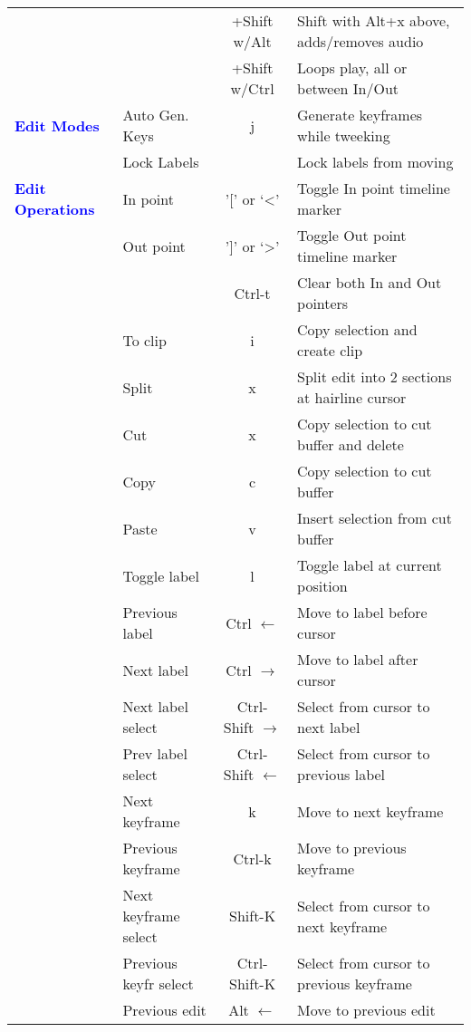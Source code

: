 \begin{center}
\begin{longtable}{ >{\bfseries}p{2cm} l c p{6cm}}
        &  & +Shift w/Alt & Shift with Alt+x above, adds/removes audio \\        
        &  & +Shift w/Ctrl & Loops play, all or between In/Out \\
        \midrule
        \textcolor{blue}{Edit Modes} & Auto Gen. Keys & j & Generate keyframes while tweeking \\        
        & Lock Labels &  & Lock labels from moving \\
        \midrule
        \textcolor{blue}{Edit Operations} & In point & '[' or ‘<’ & Toggle In point timeline marker \\        
        & Out point & ']' or ‘>’ & Toggle Out point timeline marker \\        
        &  & Ctrl-t & Clear both In and Out pointers \\        
        & To clip & i & Copy selection and create clip \\        
        & Split & x & Split edit into 2 sections at hairline cursor \\        
        & Cut & x & Copy selection to cut buffer and delete \\        
        & Copy & c & Copy selection to cut buffer \\        
        & Paste & v & Insert selection from cut buffer \\        
        & Toggle label & l & Toggle label at current position \\        
        & Previous label & Ctrl $\leftarrow$ & Move to label before cursor \\        
        & Next label & Ctrl $\rightarrow$ & Move to label after cursor \\        
        & Next label select & Ctrl-Shift $\rightarrow$ & Select from cursor to next label \\        
        & Prev label select & Ctrl-Shift $\leftarrow$ & Select from cursor to previous label \\        
        & Next keyframe & k & Move to next keyframe \\        
        & Previous keyframe & Ctrl-k & Move to previous keyframe \\        
        & Next keyframe select & Shift-K & Select from cursor to next keyframe \\        
        & Previous keyfr select & Ctrl-Shift-K & Select from cursor to previous keyframe \\        
        & Previous edit & Alt $\leftarrow$ & Move to previous edit \\        

\end{longtable}
\end{center}

